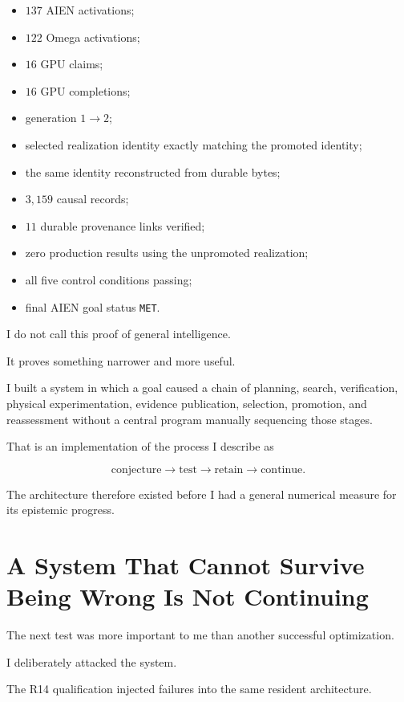 \documentclass[11pt]{article}
\begin{document}
\begin{itemize}
    \item \(137\) AIEN activations;
    \item \(122\) Omega activations;
    \item \(16\) GPU claims;
    \item \(16\) GPU completions;
    \item generation \(1\rightarrow2\);
    \item selected realization identity exactly matching the promoted identity;
    \item the same identity reconstructed from durable bytes;
    \item \(3{,}159\) causal records;
    \item \(11\) durable provenance links verified;
    \item zero production results using the unpromoted realization;
    \item all five control conditions passing;
    \item final AIEN goal status \texttt{MET}.
\end{itemize}

I do not call this proof of general intelligence.

It proves something narrower and more useful.

I built a system in which a goal caused a chain of planning, search, verification, physical experimentation, evidence publication, selection, promotion, and reassessment without a central program manually sequencing those stages.

That is an implementation of the process I describe as

\[
\text{conjecture}
\rightarrow
\text{test}
\rightarrow
\text{retain}
\rightarrow
\text{continue}.
\]

The architecture therefore existed before I had a general numerical measure for its epistemic progress.

\section{A System That Cannot Survive Being Wrong Is Not Continuing}

The next test was more important to me than another successful optimization.

I deliberately attacked the system.

The R14 qualification injected failures into the same resident architecture.
\end{document}
